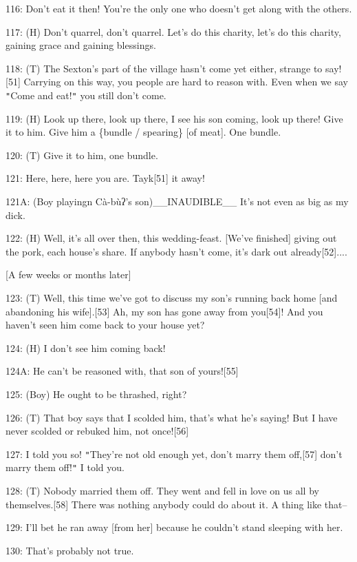 116: Don't eat it then! You're the only one who doesn't get along with the others.

117: (H) Don't quarrel, don't quarrel. Let's do this charity, let's do this charity,
gaining grace and gaining blessings.

118: (T) The Sexton's part of the village hasn't come yet either, strange to say![51]
Carrying on this way, you people are hard to reason with. Even when we say \texttt{"}Come
and eat!\texttt{"} you still don't come.

119: (H) Look up there, look up there, I see his son coming, look up there! Give
it to him. Give him a \{bundle / spearing\} [of meat]. One bundle.

120: (T) Give it to him, one bundle.

121: Here, here, here you are. Tayk[51] it away!

121A: (Boy playingn Cà-bùʔ's son)\_\_INAUDIBLE\_\_ It's not even as big as my
dick.

122: (H) Well, it's all over then, this wedding-feast. [We've finished] giving
out the pork, each house's share. If anybody hasn't come, it's dark out already[52]....

\begin{center}
[A few weeks or months later]
\end{center}

\leftskip=0pt
123: (T) Well, this time we've got to discuss my son's running back home [and abandoning
his wife].[53] Ah, my son has gone away from you[54]! And you haven't seen him
come back to your house yet?

124: (H) I don't see him coming back!

124A: He can't be reasoned with, that son of yours![55]

125: (Boy) He ought to be thrashed, right?

126: (T) That boy says that I scolded him, that's what he's saying! But I have
never scolded or rebuked him, not once![56]

127: I told you so! \texttt{"}They're not old enough yet, don't marry them off,[57]
don't marry them off!\texttt{"} I told you.

128: (T) Nobody married them off. They went and fell in love on us all by themselves.[58]
There was nothing anybody could do about it. A thing like that--

129: I'll bet he ran away [from her] because he couldn't stand sleeping with her.

130: That's probably not true.

